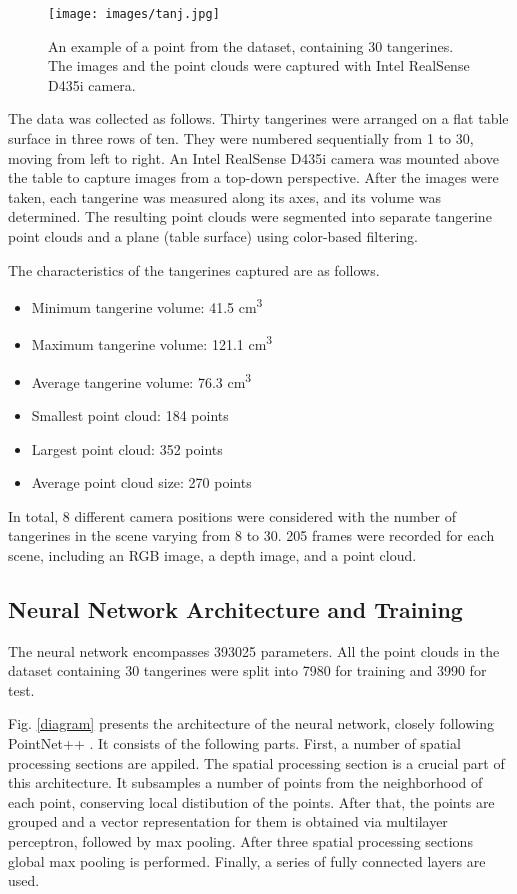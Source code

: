 \begin{thebibliography}{12}
\begin{figure}[htbp]
\centerline{\texttt{[image: images/tanj.jpg]}}
\caption{An example of a point from the dataset, containing 30 tangerines. The images and the point clouds were captured with Intel RealSense D435i camera.}
\label{tangerines}
\end{figure}

The data was collected as follows.
Thirty tangerines were arranged on a flat table surface in three rows of ten.
They were numbered sequentially from 1 to 30, moving from left to right.
An Intel RealSense D435i camera was mounted above the table to capture images from a top-down perspective.
After the images were taken, each tangerine was measured along its axes, and its volume was determined.
The resulting point clouds were segmented into separate tangerine point clouds and a plane (table surface) using color-based filtering.

The characteristics of the tangerines captured are as follows.

\begin{itemize}
    \item Minimum tangerine volume: 41.5 \si{cm^3}
    \item Maximum tangerine volume: 121.1 \si{cm^3}
    \item Average tangerine volume: 76.3 \si{cm^3}
    \item Smallest point cloud: 184 points  
    \item Largest point cloud: 352 points  
    \item Average point cloud size: 270 points  
\end{itemize}

In total, 8 different camera positions were considered with the number of tangerines in the scene varying from 8 to 30.
205 frames were recorded for each scene, including an RGB image, a depth image, and a point cloud.

\subsection{Neural Network Architecture and Training}

The neural network encompasses 393025 parameters. All the point clouds in the dataset containing 30 tangerines were split into 7980 for training and 3990 for test.

Fig. \ref{diagram} presents the architecture of the neural network, closely following PointNet++ \cite{qi2017pointnet++}.
It consists of the following parts.
First, a number of spatial processing sections are appiled.
The spatial processing section is a crucial part of this architecture.
It subsamples a number of points from the neighborhood of each point, conserving local distibution of the points.
After that, the points are grouped and a vector representation for them is obtained via multilayer perceptron, followed by max pooling.
After three spatial processing sections global max pooling is performed.
Finally, a series of fully connected layers are used.


\end{thebibliography}
